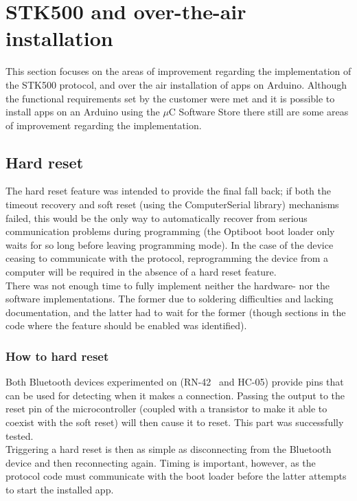 \section{STK500 and over-the-air installation}
This section focuses on the areas of improvement regarding the implementation of the STK500 protocol, and over the air installation of apps on Arduino. Although the functional requirements set by the customer were met and it is possible to  install apps on an Arduino using the $\mu$C Software Store there still are some areas of improvement regarding the implementation.

	\subsection{Hard reset}
    The hard reset feature was intended to provide the final fall back; if both the timeout recovery and soft reset
    (using the ComputerSerial library) mechanisms failed, this would be the only way to automatically recover from
    serious communication problems during programming (the Optiboot boot loader only waits for so long before leaving
    programming mode). In the case of the device ceasing to communicate with the protocol, reprogramming the device
    from a computer will be required in the absence of a hard reset feature.\\
    There was not enough time to fully implement neither the hardware- nor the software implementations. The former
    due to soldering difficulties and lacking documentation, and the latter had to wait for the former (though
    sections in the code where the feature should be enabled was identified).

	   \subsubsection{How to hard reset}
    	Both Bluetooth devices experimented on (RN-42~\cite{rn-42} and HC-05) provide pins that can be used for detecting
        when it makes a connection. Passing the output to the reset pin of the microcontroller (coupled with a
        transistor to make it able to coexist with the soft reset) will then cause it to reset. This part was
        successfully tested.\\

        Triggering a hard reset is then as simple as disconnecting from the Bluetooth device and then reconnecting
        again. Timing is important, however, as the protocol code must communicate with the boot loader before
        the latter attempts to start the installed app.
	
